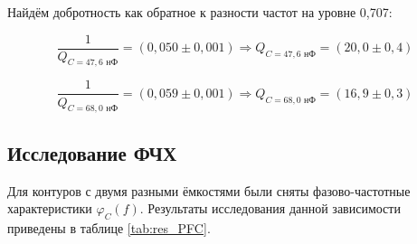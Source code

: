 \documentclass[a4paper, 12pt]{article}
\begin{document}
    Найдём добротность как обратное к разности частот на уровне 0,707:
    
    \begin{equation}
    	\frac{1}{Q_{C=47,6 \text{ нФ}}} = \left(0,050 \pm 0,001 \right) \Rightarrow Q_{C=47,6 \text{ нФ}} = \left(20,0 \pm 0,4 \right)
    \end{equation}
    
    \begin{equation}
    	\frac{1}{Q_{C=68,0 \text{ нФ}}} = \left(0,059 \pm 0,001 \right) \Rightarrow Q_{C=68,0 \text{ нФ}} = \left(16,9 \pm 0,3 \right)
    \end{equation}

    \subsection{Исследование ФЧХ}

    Для контуров с двумя разными ёмкостями были сняты фазово-частотные характеристики $\varphi_C(f)$. Результаты исследования данной зависимости приведены в таблице \ref{tab:res_PFC}.
        
\end{document}
